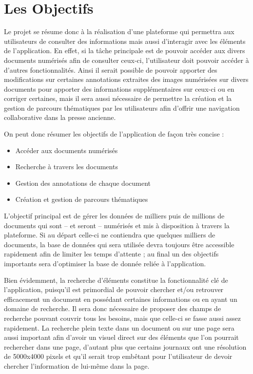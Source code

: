 \section{Les Objectifs}
	\label{sec:objectifs}

    Le projet se résume donc à la réalisation d’une plateforme qui permettra aux utilisateurs de consulter des informations mais aussi d’interagir avec les éléments de l’application. En effet, si la tâche principale est de pouvoir accéder aux divers documents numérisés afin de consulter ceux-ci, l’utilisateur doit pouvoir accéder à d’autres fonctionnalités. Ainsi il serait possible de pouvoir apporter des modifications sur certaines annotations extraites des images numérisées sur divers documents pour apporter des informations supplémentaires sur ceux-ci ou en corriger certaines, mais il sera aussi nécessaire de permettre la création et la gestion de parcours thématiques par les utilisateurs afin d’offrir une navigation collaborative dans la presse ancienne.

    On peut donc résumer les objectifs de l’application de façon très concise :

    \begin{itemize}
        \item{Accéder aux documents numérisés}
        \item{Recherche à travers les documents}
        \item{Gestion des annotations de chaque document}
        \item{Création et gestion de parcours thématiques}
    \end{itemize}

    L’objectif principal est de gérer les données de milliers puis de millions de documents qui sont – et seront – numérisés et mis à disposition à travers la plateforme. Si au départ celle-ci ne contiendra que quelques milliers de documents, la base de données qui sera utilisée devra toujours être accessible rapidement afin de limiter les temps d’attente ; au final un des objectifs importants sera d’optimiser la base de donnée reliée à l’application.

    Bien évidemment, la recherche d’éléments constitue la fonctionnalité clé de l’application, puisqu’il est primordial de pouvoir chercher et/ou retrouver efficacement un document en possédant certaines informations ou en ayant un domaine de recherche. Il sera donc nécessaire de proposer des champs de recherche pouvant couvrir tous les besoins, mais que celle-ci se fasse aussi assez rapidement. La recherche plein texte dans un document ou sur une page sera aussi important afin d’avoir un visuel direct sur des éléments que l’on pourrait rechercher dans une page, d’autant plus que certains journaux ont une résolution de 5000x4000 pixels et qu’il serait trop embêtant pour l’utilisateur de devoir chercher l’information de lui-même dans la page.

